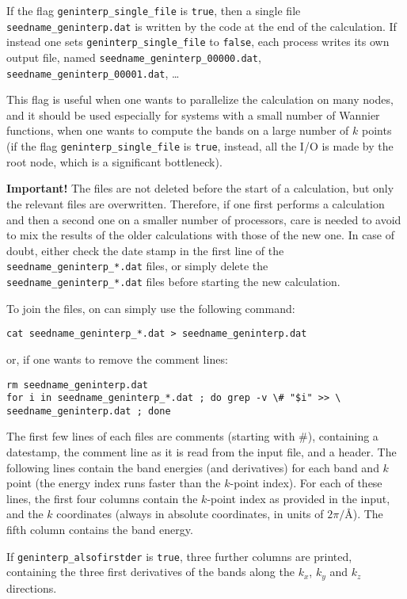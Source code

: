 If the flag \verb|geninterp_single_file| is \verb|true|, then a single
file {\tt seedname\_geninterp.dat} is written by the code at the end
of the calculation. If instead one sets \verb|geninterp_single_file|
to \verb|false|, each process writes its own output file, named 
{\tt seedname\_geninterp\_00000.dat}, {\tt
  seedname\_geninterp\_00001.dat}, \ldots

This flag is useful when one wants to parallelize the calculation on
many nodes, and it should be used especially for systems with a small
number of Wannier functions, when one wants to compute the bands on a
large number of $k$ points (if the flag \verb|geninterp_single_file|
is \verb|true|, instead, all the I/O is made by the root node, which
is a significant bottleneck).

{\bf Important!} The files are not deleted before the start of a
calculation, but only the relevant files are overwritten. Therefore,
if one first performs a calculation and then a second one on a smaller
number of processors, care is needed to avoid to mix the results of
the older calculations with those of the new one. In case of doubt,
either check the date stamp in the first line of the {\tt
    seedname\_geninterp\_*.dat} files, or simply
delete the  {\tt
    seedname\_geninterp\_*.dat} files before starting the new
  calculation.

To join the files, on can simply use the following command:
\begin{verbatim}
cat seedname_geninterp_*.dat > seedname_geninterp.dat
\end{verbatim}
or, if one wants to remove the comment lines:
\begin{verbatim}
rm seedname_geninterp.dat
for i in seedname_geninterp_*.dat ; do grep -v \# "$i" >> \
seedname_geninterp.dat ; done
\end{verbatim}


The first few lines of each files are comments (starting with \#),
containing a datestamp, the
comment line as it is read from the input file, and a header.
The following lines contain the band energies (and
derivatives) for each band and $k$ point (the energy
index runs faster than the $k$-point index).
For each of these lines, the first four columns contain the $k$-point index as provided in the
input, and the $k$ coordinates (always in absolute coordinates, in
units of $2\pi/$\AA).
The fifth column contains the band energy.

If \verb#geninterp_alsofirstder# is \verb#true#, three further columns
are printed, containing the three first derivatives of the bands along the $k_x$, $k_y$
and $k_z$ directions.

